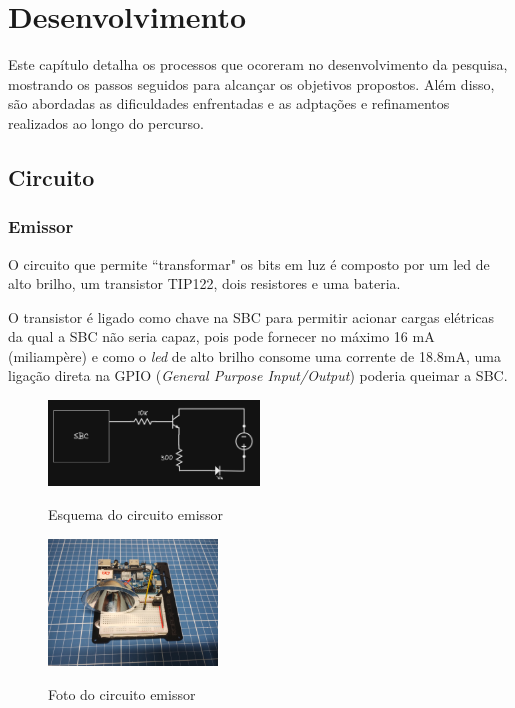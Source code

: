 \section{Desenvolvimento}

Este capítulo detalha os processos que ocoreram no desenvolvimento da pesquisa, mostrando os passos seguidos para alcançar os objetivos propostos. Além disso, são abordadas as dificuldades enfrentadas e as adptações e refinamentos realizados ao longo do percurso.

\subsection{Circuito}

\subsubsection{Emissor}

O circuito que permite ``transformar" os bits em luz é composto por um led de alto brilho, um transistor TIP122, dois resistores e uma bateria.

O transistor é ligado como chave na SBC para permitir acionar cargas elétricas da qual a SBC não seria capaz, pois pode fornecer no máximo 16 mA (miliampère)  e como o \textit{led} de alto brilho consome uma corrente de 18.8mA, uma ligação direta na GPIO (\textit{General Purpose Input/Output}) poderia queimar a SBC.

\begin{figure}[!htbp]
  \caption{Esquema do circuito emissor}
  \includegraphics[width=0.5\textwidth]{images/esquema_circuito_emisor.png}
  \label{esquema-circuito-emissor}
\end{figure}

\begin{figure}[!htbp]
  \caption{Foto do circuito emissor}
  \includegraphics[width=0.4\textwidth]{images/foto_circuito_emisor.jpg}
  \label{foto-circuito-emissor}
\end{figure}

